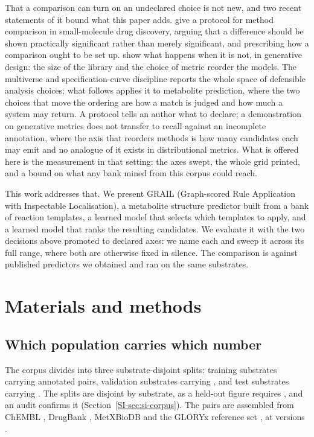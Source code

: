 That a comparison can turn on an undeclared choice is not new, and two recent statements of it
bound what this paper adds. \citet{Ash_2025} give a protocol for method comparison in small-molecule
drug discovery, arguing that a difference should be shown practically significant rather than
merely significant, and prescribing how a comparison ought to be set up. \citet{Ozcelik_2025} show
what happens when it is not, in generative design: the size of the library and the choice of metric
reorder the models. The multiverse and specification-curve discipline
\citep{Steegen_2016, Simonsohn_2020} reports the whole space of defensible analysis
choices; what follows applies it to metabolite prediction, where the
two choices that move the ordering are how a match is judged and how much a system may return. A protocol tells an author
what to declare; a demonstration on generative metrics does not transfer to recall against an
incomplete annotation, where the axis that reorders methods is how many candidates each may emit
and no analogue of it exists in distributional metrics. What is offered here is the measurement in
that setting: the axes swept, the whole grid printed, and a bound on what any bank mined from this
corpus could reach.

This work addresses that. We present GRAIL (Graph-scored Rule Application with Inspectable
Localisation), a metabolite structure predictor built from a bank of reaction templates, a learned
model that selects which templates to apply, and a learned model that ranks the resulting
candidates. We evaluate it with the two decisions above promoted to declared axes: we name each
and sweep it across its full range, where both are otherwise fixed in silence. The comparison is against
\numComparatorsColumnsWord{} published predictors we obtained and ran on the same substrates.\section{Materials and methods}
\label{sec:methods}

\subsection{Which population carries which number}
\label{sec:populations}

The corpus divides into three substrate-disjoint splits: \numSplitTrainSubstrates{} training
substrates carrying \numSplitTrainPairs{} annotated pairs, \numSplitValSubstrates{} validation
substrates carrying \numSplitValPairs{}, and \numSplitTestSubstrates{} test substrates carrying
\numSplitTestPairs{}. The splits are disjoint by substrate, as a held-out figure requires \citep{Joeres_2025, Kretschmer_2025}, and an audit confirms it (Section~\ref{SI-sec:si-corpus}). The pairs are
assembled from ChEMBL \citep{Zdrazil_2024}, DrugBank \citep{Wishart_2018}, MetXBioDB
\citep{Djoumbou_Feunang_2019} and the GLORYx reference set \citep{de_Bruyn_Kops_2020}, at versions
\CorpusVersions{}.

